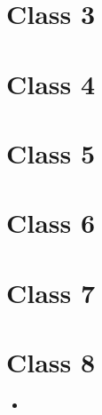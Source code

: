\documentclass[11pt]{article}
\newenvironment{itemise}{
\begin{itemize}
  \setlength{\itemsep}{1pt}
  \setlength{\parskip}{0pt}
  \setlength{\parsep}{0pt}
}{\end{itemize}}
\begin{document}
\section*{Class 3}
\section*{Class 4}
\section*{Class 5}
\section*{Class 6}
\section*{Class 7}
\section*{Class 8}


\begin{itemise}
\item 
\end{itemise}

















%
%
\end{document}
